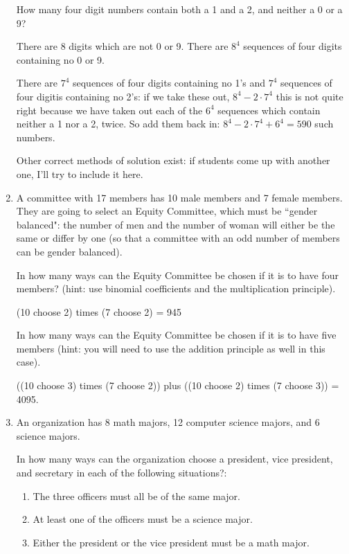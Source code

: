 \documentclass[12pt]{article}
\begin{document}
\begin{enumerate}
How many four digit numbers contain both a 1 and a 2, and neither a 0 or a 9?

There are 8 digits which are not 0 or 9.  There are $8^4$ sequences of four digits containing no 0 or 9.

There are $7^4$ sequences of four digits containing no 1's and $7^4$ sequences of four digitis containing no 2's:
if we take these out, $8^4-2\cdot 7^4$ this is not quite right because we have taken out each of the $6^4$ sequences which contain neither a 1 nor a 2, twice.  So add them back in: $8^4-2\cdot 7^4+6^4=590$ such numbers.

Other correct methods of solution exist:  if students come up with another one, I'll try to include it here.

\newpage

\item  A committee with 17 members has 10 male members and 7 female members.  They are going to select an Equity Committee, which must be ``gender balanced":  the number of men and the number of woman will either be the same or differ by one (so that a committee with an odd number of members can be gender balanced).

In how many ways can the Equity Committee be chosen if it is to have four members?  (hint:  use binomial coefficients and the multiplication principle).

(10 choose 2) times (7 choose 2) = 945

In how many ways can the Equity Committee be chosen if it is to have five members (hint: you will need to use the addition principle as well in this case).

((10 choose 3) times (7 choose 2)) plus ((10 choose 2) times (7 choose 3)) = 4095.

\newpage

\item  An organization has 8 math majors, 12 computer science majors, and 6 science majors.

In how many ways can the organization choose a president, vice president, and secretary in each of the following situations?:

\begin{enumerate}
\item   The three officers must all be of the same major.

\item   At least one of the officers must be a science major.

\item  Either the president or the vice president must be a math major.


\end{enumerate}
\end{enumerate}
\end{document}
